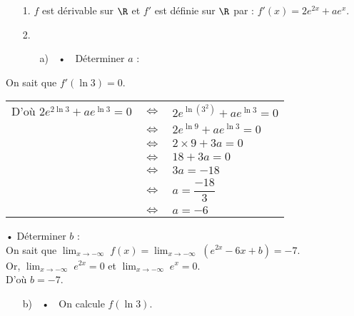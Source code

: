 \vspace*{.3cm}

\begin{itemize}
\item[1.] $f$ est dérivable sur $\R$ et $f'$ est définie sur $\R$ par : $f'(x) = 2e^{2x} + ae^x$. \\
\item[2.]
\begin{itemize}
\item[a)] $\;$ • $\;$ Déterminer $a$ : \\
\end{itemize}
\end{itemize}

On sait que $f'\left(\ln 3\right) = 0$. \\

\begin{tabular}{lll}
D'où $2e^{2\ln 3} + ae^{\ln 3} = 0$ & $\Longleftrightarrow$ & $2e^{\ln\left(3^2\right)} + ae^{\ln 3} = 0$ \\
& $\Longleftrightarrow$ & $2e^{\ln 9} + ae^{\ln 3} = 0$ \\
& $\Longleftrightarrow$ & $2 \times 9 + 3a = 0$ \\
& $\Longleftrightarrow$ & $18 + 3a = 0$ \\
& $\Longleftrightarrow$ & $3a = -18$ \\
& $\Longleftrightarrow$ & $a = \dfrac{-18}{3}$ \\
& $\Longleftrightarrow$ & $a = -6$ \\
\end{tabular}

• Déterminer $b$ : \\

On sait que $ \displaystyle {\lim_{x \rightarrow -\infty}} \; f(x) = \displaystyle {\lim_{x \rightarrow -\infty}} \; \left(e^{2x} - 6x + b\right) = -7$. \\

Or, $\displaystyle {\lim_{x \rightarrow -\infty}} \; e^{2x} = 0$ et $\displaystyle {\lim_{x \rightarrow -\infty}} \; e^x = 0$. \\

D'où $b = -7$. \\

\begin{itemize}
\item[b)] $\;$ • $\;$ On calcule $f\left(\ln 3\right)$. \\
\end{itemize}

